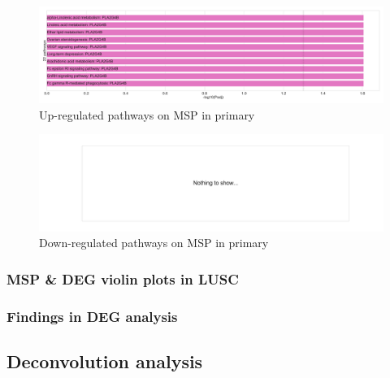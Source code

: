 \documentclass{beamer}
\begin{document}
\begin{frame}[allowframebreaks]
                    \begin{figure}
                        \includegraphics[width=0.6 \linewidth]{figures/DEG/Enrichment/STAR.TPM.SQC.Primary.MSP-Median.Up.KEGG.pdf}
                        \caption{Up-regulated pathways on MSP in primary}
                    \end{figure}

                    \begin{figure}
                        \includegraphics[width=0.6 \linewidth]{figures/DEG/Enrichment/STAR.TPM.SQC.Primary.MSP-Median.Down.KEGG.pdf}
                        \caption{Down-regulated pathways on MSP in primary}
                    \end{figure}
                \end{frame}

                \begin{frame}
                    \frametitle{MSP \& DEG violin plots in LUSC}
                \end{frame}

            \begin{frame}
                \frametitle{Findings in DEG analysis}
            \end{frame}

        \subsection{Deconvolution analysis}
\end{document}
